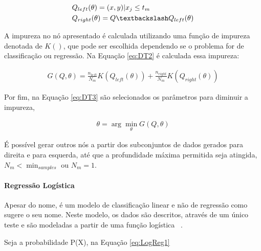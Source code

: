           \begin{equation}\label{eq:DT}
            \begin{aligned}
              & Q_{left}(\theta) = (x,y)|x_{j} \leq t_{m} \\
              & Q_{right}(\theta) = Q \textbackslash Q_{left}(\theta)
          \end{aligned}
          \end{equation}


          A impureza no nó apresentado é calculada utilizando uma função de impureza denotada de $K()$, que pode ser escolhida dependendo se o 
          problema for de classificação ou regressão. Na Equação \ref{eq:DT2} é calculada essa impureza:

          \begin{equation}\label{eq:DT2}
            \begin{aligned}
              G(Q,\theta) = \frac{n_{left}}{N_{m}}K(Q_{left}(\theta)) + \frac{n_{right}}{N_{m}}K(Q_{right}(\theta))
          \end{aligned}
          \end{equation}


          Por fim, na Equação \ref{eq:DT3} são selecionados os parâmetros para diminuir a impureza,

          \begin{equation}\label{eq:DT3}
            \begin{aligned}
              \theta = \arg\min_{\theta}G(Q,\theta)
          \end{aligned} 
          \end{equation}

          É possível gerar outros nós a partir dos subconjuntos de dados gerados para direita e para esquerda, 
          até que a profundidade máxima permitida seja atingida, $N_{m} < \min_{samples}$ ou $N_{m} = 1$.

        \paragraph{Regressão Logística}
        \label{par:reglog}

          Apesar do nome, é um modelo de classificação linear e não de regressão como sugere o seu nome. Neste modelo, os dados
          são descritos, através de um único teste e são modeladas a partir de uma função logística ~\cite{nasrabadi2007pattern}.

          Seja a probabilidade P(X), na Equação \ref{eq:LogReg1}


